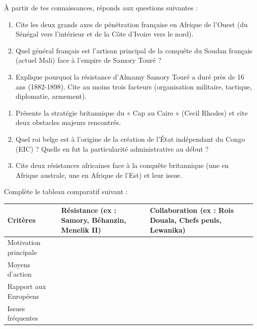 \documentclass[11pt]{article}
\newcounter{popsec}
\newcounter{popsub}
\newcommand{\courssub}[1]{%
  \stepcounter{popsub}%
  \par\vspace{9pt}\noindent{\popxbold\fontsize{11.5}{13}\selectfont\color{popink}{\color{poporange}\thepopsec.\thepopsub}\hspace{6pt}#1}\par\nopagebreak\vspace{4pt}
}
\begin{document}
\courssub{Je m'entraîne}

\begin{exercice}
À partir de tes connaissances, réponds aux questions suivantes :
\begin{enumerate}
    \item Cite les deux grands axes de pénétration française en Afrique de l'Ouest (du Sénégal vers l'intérieur et de la Côte d'Ivoire vers le nord).
    \item Quel général français est l'artisan principal de la conquête du Soudan français (actuel Mali) face à l'empire de Samory Touré ?
    \item Explique pourquoi la résistance d'Almamy Samory Touré a duré près de 16 ans (1882-1898). Cite au moins trois facteurs (organisation militaire, tactique, diplomatie, armement).
\end{enumerate}
\end{exercice}

\begin{exercice}
\begin{enumerate}
    \item Présente la stratégie britannique du « Cap au Caire » (Cecil Rhodes) et cite deux obstacles majeurs rencontrés.
    \item Quel roi belge est à l'origine de la création de l'État indépendant du Congo (EIC) ? Quelle en fut la particularité administrative au début ?
    \item Cite deux résistances africaines face à la conquête britannique (une en Afrique australe, une en Afrique de l'Est) et leur issue.
\end{enumerate}
\end{exercice}

\begin{exercice}
Complète le tableau comparatif suivant :

\begin{center}
\begin{tabularx}{\linewidth}{|l|X|X|}
\hline
\textbf{Critères} & \textbf{Résistance (ex : Samory, Béhanzin, Menelik II)} & \textbf{Collaboration (ex : Rois Douala, Chefs peuls, Lewanika)} \\
\hline
Motivation principale & & \\
\hline
Moyens d'action & & \\
\hline
Rapport aux Européens & & \\
\hline
Issues fréquentes & & \\
\hline
\end{tabularx}
\end{center}
\end{exercice}
\end{document}
